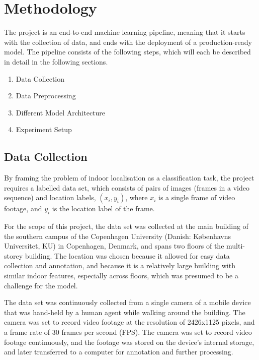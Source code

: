 \documentclass{article}
\begin{document}



  \section{Methodology} %
  \label{sec:methodology}

  The project is an end-to-end machine learning pipeline, meaning that it
  starts with the collection of data, and ends with the deployment of a
  production-ready model. The pipeline consists of the following steps, which
  will each be described in detail in the following sections.

  \begin{enumerate}
    \item Data Collection
    \item Data Preprocessing 
    \item Different Model Architecture
    \item Experiment Setup
  \end{enumerate}

  \subsection{Data Collection} %
  \label{sub:data-collection}

  By framing the problem of indoor localisation as a classification task, the
  project requires a labelled data set, which consists of pairs of images
  (frames in a video sequence) and location labels, $(x_i, y_i)$, where $x_i$ is
  a single frame of video footage, and $y_i$ is the location label of the frame.

  For the scope of this project, the data set was collected at the main building
  of the southern campus of the Copenhagen University (Danish: K\o{}benhavns
  Universitet, KU) in Copenhagen, Denmark, and spans two floors of the
  multi-storey building. The location was chosen because it allowed for easy
  data collection and annotation, and because it is a relatively large building
  with similar indoor features, especially across floors, which was presumed to
  be a challenge for the model.

  The data set was continuously collected from a single camera of a mobile
  device that was hand-held by a human agent while walking around the building.
  The camera was set to record video footage at the resolution of 2426x1125
  pixels, and a frame rate of 30 frames per second (FPS). The camera was set to
  record video footage continuously, and the footage was stored on the device's
  internal storage, and later transferred to a computer for annotation and
  further processing.
\end{document}
